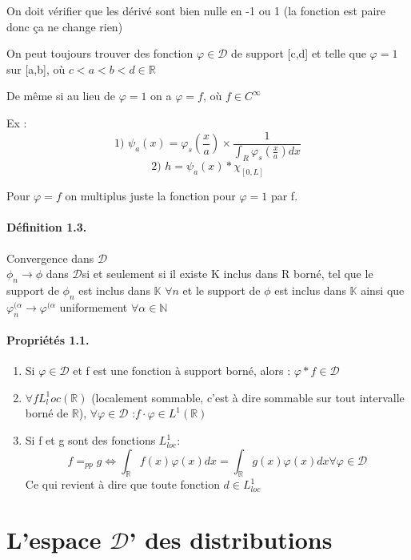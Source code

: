 \documentclass[12pt,a4paper]{report}
\newcommand{\D}{\ensuremath{\mathcal{D}}}
\begin{document}
On doit vérifier que les dérivé sont bien nulle en -1 ou 1 (la fonction est paire donc ça ne change rien)

On peut toujours trouver des fonction \(\varphi \in \D\) de support [c,d] et telle que \(\varphi = 1\) sur [a,b], où \(c < a < b < d \in \mathbb{R}\)

De même si au lieu de \(\varphi = 1\) on a \(\varphi = f\), où \(f \in C^{\infty}\)

Ex :  \[\text{1) } \psi_a (x) = \varphi_s \left(\frac{x}{a}\right) \times \frac{1}{\int_R \varphi_s \left(\frac{x}{a}\right) dx}\]
\[
	\text{2) }h = \psi_a (x) * \chi_{[0,L]}
\]

Pour \(\varphi = f\) on multiplus juste la fonction pour \(\varphi = 1\) par f.

\paragraph{Définition 1.3.} Convergence dans \(\D\)\\
\(\phi_n \rightarrow \phi\) dans \D si et seulement si il existe K inclus dans R borné, tel que le support de \(\phi_n\) est inclus dans \(\mathbb{K}\) \(\forall n\) et le support de \(\phi\) est inclus dans \(\mathbb{K}\) ainsi que \(\varphi_n^{(\alpha} \rightarrow \varphi^{(\alpha}\) uniformement \(\forall \alpha \in \mathbb{N}\)

\paragraph{Propriétés 1.1.}
\begin{enumerate}
	\item Si \(\varphi \in \D\) et f est une fonction à support borné, alors : \(\varphi * f \in \D\)
	\item \(\forall f L^1_loc(\mathbb{R})\) (localement sommable, c'est à dire sommable sur tout intervalle borné de \(\mathbb{R}\)), \(\forall \varphi \in \D\) :\quad \(f\cdot \varphi \in L^1(\mathbb{R})\)
	\item Si f et g sont des fonctions \(L^1_{loc}\):
	\[
		f =_{pp} g \Leftrightarrow \int_{\mathbb{R}} f(x) \varphi(x) dx = \int_{\mathbb{R}} g(x)  \varphi(x) dx \forall \varphi \in \D
	\]
	Ce qui revient à dire que toute fonction \(d \in L^1_{loc}\)
\end{enumerate}

\section{L'espace \D' des distributions}
\end{document}
